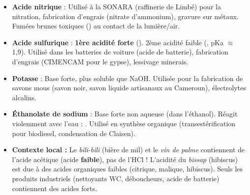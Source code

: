 \documentclass[11pt]{article}
\begin{document}
\begin{savaistu}
\begin{itemize}
  \item \textbf{Acide nitrique } : Utilisé à la SONARA (raffinerie de Limbé) pour la nitration, fabrication d'engrais (nitrate d'ammonium), gravure sur métaux. Fumées brunes toxiques () au contact de la lumière/air.
  \item \textbf{Acide sulfurique } : \textbf{1ère acidité forte} (). 2ème acidité faible (, pKa $\approx$ 1,9). Utilisé dans les batteries de voiture (acide de batterie), fabrication d'engrais (CIMENCAM pour le gypse), lessivage minerais.
  \item \textbf{Potasse } : Base forte, plus soluble que NaOH. Utilisée pour la fabrication de savons mous (savon noir, savon liquide artisanaux au Cameroun), électrolytes alcalins.
  \item \textbf{Éthanolate de sodium } : Base forte non aqueuse (dans l'éthanol). Réagit violemment avec l'eau : . Utilisé en synthèse organique (transestérification pour biodiesel, condensation de Claisen).
  \item \textbf{Contexte local :} Le \emph{bili-bili} (bière de mil) et le \emph{vin de palme} contiennent de l'acide acétique (acide \textbf{faible}), pas de l'HCl ! L'acidité du \emph{bissap} (hibiscus) est due à des acides organiques faibles (citrique, malique, hibiscus). Seuls les produits industriels (nettoyants WC, déboucheurs, acide de batterie) contiennent des acides forts.
\end{itemize}
\end{savaistu}
\end{document}
